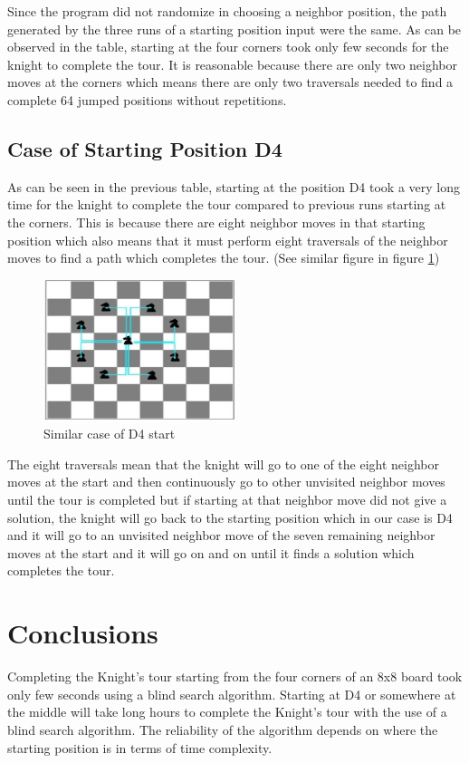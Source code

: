 	Since the program did not randomize in choosing a neighbor position, the path generated by the three runs of a starting position input were the same. As can be observed in the table, starting at the four corners took only few seconds for the knight to complete the tour.  It is reasonable because there are only  two neighbor moves at the corners which means there are only two traversals needed to find a complete 64 jumped positions without repetitions. 
\subsection{Case of Starting Position D4}
	As can be seen in the previous table, starting at the position D4 took a very long time for the knight to complete the tour compared to previous runs starting at the corners.  This is because there are eight neighbor moves in that starting position which also means that it must perform eight traversals of the neighbor moves to find a path which completes the tour. (See similar figure in figure \ref{fig:kpos1})
	\begin{figure}[h]
 	 \centering
   \includegraphics[width=0.5\textwidth]{kpos.jpg}
  	\caption{Similar case of D4 start}
 	 \label{fig:kpos1}
	\end{figure}
	The eight traversals mean that the knight will go to one of the eight neighbor moves at the start and then continuously go to other unvisited neighbor moves until the tour is completed but if starting at that neighbor move did not give a solution, the knight will go back to the starting position which in our case is D4 and it will go to an unvisited neighbor move of the seven remaining neighbor moves at the start and it will go on and on until it finds a solution which completes the tour. 
\section{Conclusions}
Completing the Knight's tour starting from the four corners of an 8x8 board took only few seconds using a blind search algorithm.  Starting at D4 or somewhere at the middle will take long hours to complete the Knight's tour with the use of a blind search algorithm.  The reliability of the algorithm depends on where the starting position is in terms of time complexity. 






